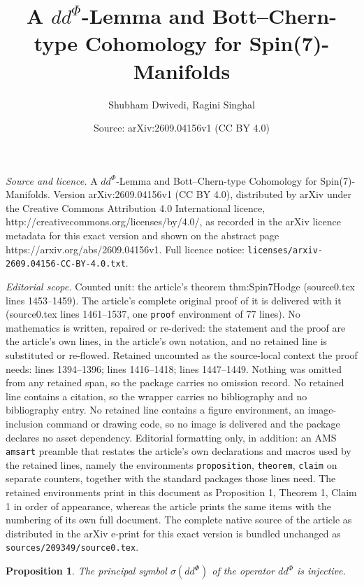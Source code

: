 \documentclass[10pt,a4paper]{amsart}
\title{A $dd^\Phi$-Lemma and Bott–Chern-type Cohomology for Spin(7)-Manifolds}
\author{Shubham Dwivedi, Ragini Singhal}
\date{Source: arXiv:2609.04156v1 (CC BY 4.0)}
\newtheorem{proposition}{Proposition}
\def\ddphi{dd^{\Phi}}
\begin{document}
\maketitle

\noindent\emph{Source and licence.} A $dd^\Phi$-Lemma and Bott–Chern-type Cohomology for Spin(7)-Manifolds. Version arXiv:2609.04156v1 (CC BY 4.0), distributed by arXiv under the Creative Commons Attribution 4.0 International licence, http://creativecommons.org/licenses/by/4.0/, as recorded in the arXiv licence metadata for this exact version and shown on the abstract page https://arxiv.org/abs/2609.04156v1. Full licence notice: \texttt{licenses/arxiv-2609.04156-CC-BY-4.0.txt}.\par\smallskip

\noindent\textit{Editorial scope.} Counted unit: the article's theorem thm:Spin7Hodge (source0.tex lines 1453--1459). The article's complete original proof of it is delivered with it (source0.tex lines 1461--1537, one \texttt{proof} environment of 77 lines). No mathematics is written, repaired or re-derived: the statement and the proof are the article's own lines, in the article's own notation, and no retained line is substituted or re-flowed.  Retained uncounted as the source-local context the proof needs: lines 1394--1396; lines 1416--1418; lines 1447--1449.  Nothing was omitted from any retained span, so the package carries no omission record.  No retained line contains a citation, so the wrapper carries no bibliography and no bibliography entry.  No retained line contains a figure environment, an image-inclusion command or drawing code, so no image is delivered and the package declares no asset dependency.  Editorial formatting only, in addition: an AMS \texttt{amsart} preamble that restates the article's own declarations and macros used by the retained lines, namely the environments \texttt{proposition}, \texttt{theorem}, \texttt{claim} on separate counters, together with the standard packages those lines need.  The retained environments print in this document as Proposition 1, Theorem 1, Claim 1 in order of appearance, whereas the article prints the same items with the numbering of its own full document.  The complete native source of the article as distributed in the arXiv e-print for this exact version is bundled unchanged as \texttt{sources/209349/source0.tex}.
\begin{proposition}\label{prop:psymbold}
The principal symbol $\sigma(\ddphi)$ of the operator $\ddphi$ is injective.
\end{proposition}
\end{document}
